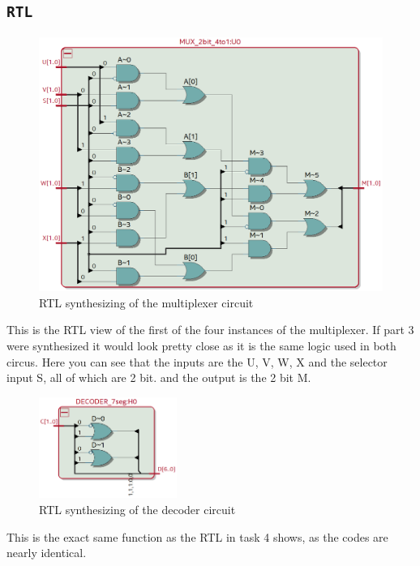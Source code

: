 \documentclass{article}
\let\oldsubsection\subsection
\renewcommand{\subsection}[1]{%
  \oldsubsection{\texttt{#1}}%
  \setcounter{subsubsection}{-1}%
}
\begin{document}
\subsection{RTL}
\begin{figure}[h]
    \centering
    \includegraphics[width=1\textwidth]{Figures/Part5_RTL_mux.png}
    \caption{RTL synthesizing of the multiplexer circuit}
    \label{fig:T05rtlmux}
\end{figure}
This is the RTL view of the first of the four instances of the multiplexer. If part 3 were synthesized it would look pretty close as it is the same logic used in both circus. Here you can see that the inputs are the U, V, W, X and the selector input S, all of which are 2 bit. and the output is the 2 bit M.\par
\begin{figure}[h]
    \centering
    \includegraphics[width=0.4\textwidth]{Figures/Part5_RTL_decoder.png}
    \caption{RTL synthesizing of the decoder circuit}
    \label{fig:T05rtldecoder}
\end{figure}
This is the exact same function as the RTL in task 4 shows, as the codes are nearly identical.
\clearpage
\end{document}
